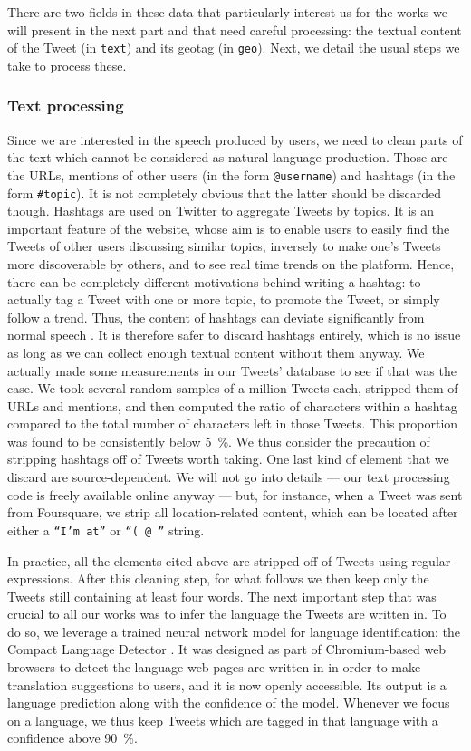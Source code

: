 \documentclass[../thesis.tex]{subfiles}
\begin{document}
There are two fields in these data that particularly interest us for the works we will
present in the next part and that need careful processing: the textual content of the
Tweet (in \texttt{text}) and its geotag (in \texttt{geo}). Next, we detail the usual
steps we take to process these. 


\subsubsection{Text processing}
\label{sec:method_text_process}
Since we are interested in the speech produced by users, we need to clean parts of the
text which cannot be considered as natural language production. Those are the URLs,
mentions of other users (in the form \texttt{@username}) and hashtags (in the form
\texttt{\#topic}). It is not completely obvious that the latter should be discarded
though. Hashtags are used on Twitter to aggregate Tweets by topics. It is an important
feature of the website, whose aim is to enable users to easily find the Tweets of other
users discussing similar topics, inversely to make one's Tweets more discoverable by
others, and to see real time trends on the platform. Hence, there can be completely
different motivations behind writing a hashtag: to actually tag a Tweet with one or more
topic, to promote the Tweet, or simply follow a trend. Thus, the content of hashtags can
deviate significantly from normal speech \cite{PageLinguisticsSelfbranding2012}. It is
therefore safer to discard hashtags entirely, which is no issue as long as we can
collect enough textual content without them anyway. We actually made some measurements
in our Tweets' database to see if that was the case. We took several random samples of a
million Tweets each, stripped them of URLs and mentions, and then computed the ratio of
characters within a hashtag compared to the total number of characters left in those
Tweets. This proportion was found to be consistently below \SI{5}{\percent}. We thus
consider the precaution of stripping hashtags off of Tweets worth taking. One last kind
of element that we discard are source-dependent. We will not go into details --- our
text processing code is freely available online anyway --- but, for instance, when a
Tweet was sent from Foursquare, we strip all location-related content, which can be
located after either a \texttt{``I'm at''} or \texttt{``( @ ''} string.

In practice, all the elements cited above are stripped off of Tweets using regular
expressions. After this cleaning step, for what follows we then keep only the Tweets
still containing at least four words. The next important step that was crucial to all
our works was to infer the language the Tweets are written in. To do so, we leverage a
trained neural network model for language identification: the Compact Language Detector
\cite{SalcianuCompactLanguage2023}. It was designed as part of Chromium-based web
browsers to detect the language web pages are written in in order to make translation
suggestions to users, and it is now openly accessible. Its output is a language
prediction along with the confidence of the model. Whenever we focus on a language, we
thus keep Tweets which are tagged in that language with a confidence above
\SI{90}{\percent}.
\end{document}
